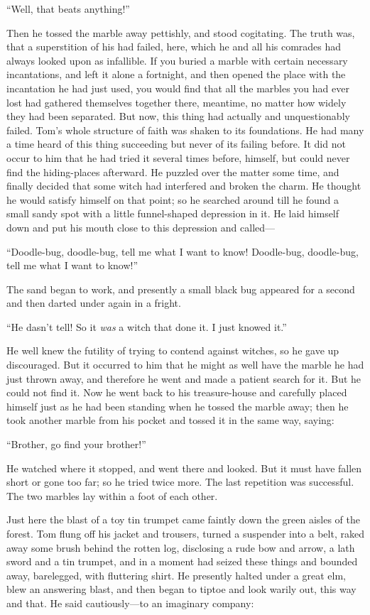 \documentclass{book}
\begin{document}
“Well, that beats anything!”

Then he tossed the marble away pettishly, and stood cogitating. The truth was, that a superstition of his had failed, here, which he and all his comrades had always looked upon as infallible. If you buried a marble with certain necessary incantations, and left it alone a fortnight, and then opened the place with the incantation he had just used, you would find that all the marbles you had ever lost had gathered themselves together there, meantime, no matter how widely they had been separated. But now, this thing had actually and unquestionably failed. Tom’s whole structure of faith was shaken to its foundations. He had many a time heard of this thing succeeding but never of its failing before. It did not occur to him that he had tried it several times before, himself, but could never find the hiding-places afterward. He puzzled over the matter some time, and finally decided that some witch had interfered and broken the charm. He thought he would satisfy himself on that point; so he searched around till he found a small sandy spot with a little funnel-shaped depression in it. He laid himself down and put his mouth close to this depression and called—

“Doodle-bug, doodle-bug, tell me what I want to know! Doodle-bug, doodle-bug, tell me what I want to know!”

The sand began to work, and presently a small black bug appeared for a second and then darted under again in a fright.

“He dasn’t tell! So it \emph{was} a witch that done it. I just knowed it.”

He well knew the futility of trying to contend against witches, so he gave up discouraged. But it occurred to him that he might as well have the marble he had just thrown away, and therefore he went and made a patient search for it. But he could not find it. Now he went back to his treasure-house and carefully placed himself just as he had been standing when he tossed the marble away; then he took another marble from his pocket and tossed it in the same way, saying:

“Brother, go find your brother!”

He watched where it stopped, and went there and looked. But it must have fallen short or gone too far; so he tried twice more. The last repetition was successful. The two marbles lay within a foot of each other.

Just here the blast of a toy tin trumpet came faintly down the green aisles of the forest. Tom flung off his jacket and trousers, turned a suspender into a belt, raked away some brush behind the rotten log, disclosing a rude bow and arrow, a lath sword and a tin trumpet, and in a moment had seized these things and bounded away, barelegged, with fluttering shirt. He presently halted under a great elm, blew an answering blast, and then began to tiptoe and look warily out, this way and that. He said cautiously—to an imaginary company:
\end{document}
